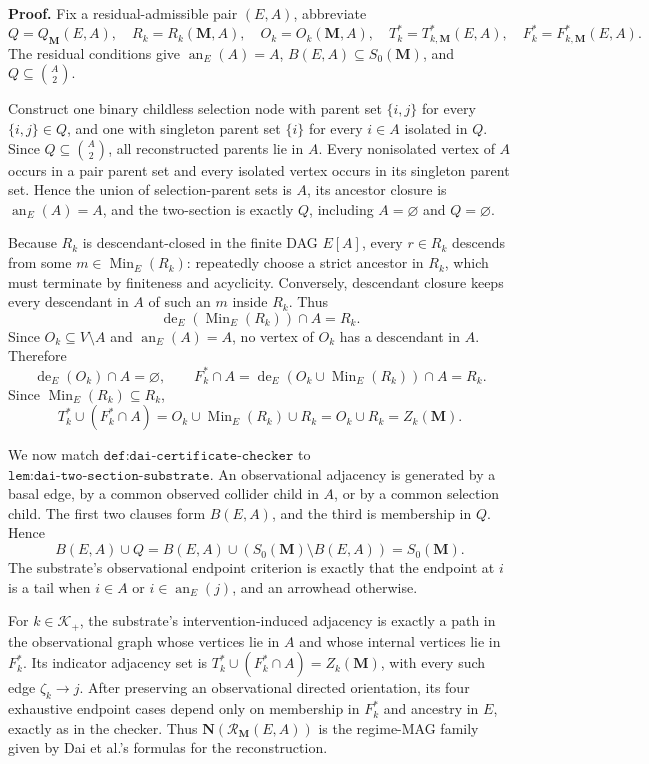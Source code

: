 \textbf{Proof.}
Fix a residual-admissible pair \((E,A)\), abbreviate
\[
Q=Q_{\mathbf M}(E,A),
\quad R_k=R_k(\mathbf M,A),
\quad O_k=O_k(\mathbf M,A),
\quad T_k^*=T^*_{k,\mathbf M}(E,A),
\quad F_k^*=F^*_{k,\mathbf M}(E,A).
\]
The residual conditions give \(\operatorname{an}_E(A)=A\), \(B(E,A)\subseteq S_0(\mathbf M)\), and \(Q\subseteq\binom A2\).

Construct one binary childless selection node with parent set \(\{i,j\}\) for every \(\{i,j\}\in Q\), and one with singleton parent set \(\{i\}\) for every \(i\in A\) isolated in \(Q\).  Since \(Q\subseteq\binom A2\), all reconstructed parents lie in \(A\).  Every nonisolated vertex of \(A\) occurs in a pair parent set and every isolated vertex occurs in its singleton parent set.  Hence the union of selection-parent sets is \(A\), its ancestor closure is \(\operatorname{an}_E(A)=A\), and the two-section is exactly \(Q\), including \(A=\varnothing\) and \(Q=\varnothing\).

Because \(R_k\) is descendant-closed in the finite DAG \(E[A]\), every \(r\in R_k\) descends from some \(m\in\operatorname{Min}_E(R_k)\): repeatedly choose a strict ancestor in \(R_k\), which must terminate by finiteness and acyclicity.  Conversely, descendant closure keeps every descendant in \(A\) of such an \(m\) inside \(R_k\).  Thus
\[
\operatorname{de}_E(\operatorname{Min}_E(R_k))\cap A=R_k.
\]
Since \(O_k\subseteq V\setminus A\) and \(\operatorname{an}_E(A)=A\), no vertex of \(O_k\) has a descendant in \(A\).  Therefore
\[
\operatorname{de}_E(O_k)\cap A=\varnothing,
\qquad
F_k^*\cap A
=\operatorname{de}_E(O_k\cup\operatorname{Min}_E(R_k))\cap A
=R_k.
\]
Since \(\operatorname{Min}_E(R_k)\subseteq R_k\),
\[
T_k^*\cup(F_k^*\cap A)
=O_k\cup\operatorname{Min}_E(R_k)\cup R_k
=O_k\cup R_k
=Z_k(\mathbf M).
\]

We now match \(\texttt{def:dai-certificate-checker}\) to \(\texttt{lem:dai-two-section-substrate}\).  An observational adjacency is generated by a basal edge, by a common observed collider child in \(A\), or by a common selection child.  The first two clauses form \(B(E,A)\), and the third is membership in \(Q\).  Hence
\[
B(E,A)\cup Q
=B(E,A)\cup(S_0(\mathbf M)\setminus B(E,A))
=S_0(\mathbf M).
\]
The substrate's observational endpoint criterion is exactly that the endpoint at \(i\) is a tail when \(i\in A\) or \(i\in\operatorname{an}_E(j)\), and an arrowhead otherwise.

For \(k\in\mathcal K_+\), the substrate's intervention-induced adjacency is exactly a path in the observational graph whose vertices lie in \(A\) and whose internal vertices lie in \(F_k^*\).  Its indicator adjacency set is \(T_k^*\cup(F_k^*\cap A)=Z_k(\mathbf M)\), with every such edge \(\zeta_k\to j\).  After preserving an observational directed orientation, its four exhaustive endpoint cases depend only on membership in \(F_k^*\) and ancestry in \(E\), exactly as in the checker.  Thus \(\mathbf N(\mathcal R_{\mathbf M}(E,A))\) is the regime-MAG family given by Dai et al.'s formulas for the reconstruction.

